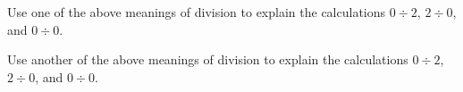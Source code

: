 \documentclass{ximera}
\begin{document}
%
%
%
%
%
%
%
%
%

\newpage
\begin{problem}
Use one of the above meanings of division to explain the calculations $0\div 2$, $2\div 0$, and $0\div 0$.  
\begin{freeResponse}
\end{freeResponse}
\end{problem}

\begin{problem}
Use another of the above meanings of division to explain the calculations $0\div 2$, $2\div 0$, and $0\div 0$.  
\begin{freeResponse}
\end{freeResponse}
\end{problem}

\end{document}
